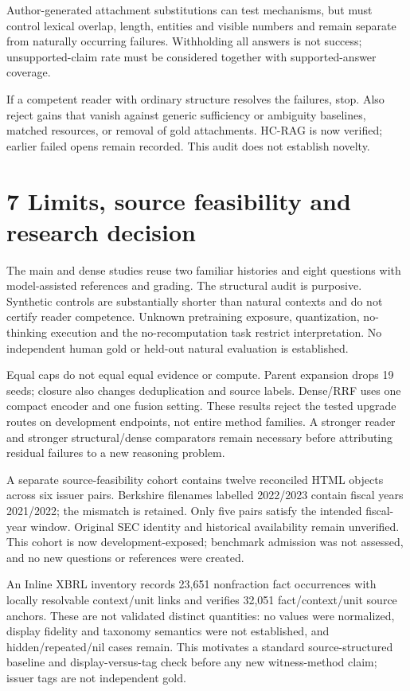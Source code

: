 \documentclass[11pt]{article}
\begin{document}
Author-generated attachment substitutions can test mechanisms, but must control lexical overlap, length, entities and visible numbers and remain separate from naturally occurring failures. Withholding all answers is not success; unsupported-claim rate must be considered together with supported-answer coverage.


If a competent reader with ordinary structure resolves the failures, stop. Also reject gains that vanish against generic sufficiency or ambiguity baselines, matched resources, or removal of gold attachments. HC-RAG is now verified; earlier failed opens remain recorded. This audit does not establish novelty.


\section*{7  Limits, source feasibility and research decision}

The main and dense studies reuse two familiar histories and eight questions with model-assisted references and grading. The structural audit is purposive. Synthetic controls are substantially shorter than natural contexts and do not certify reader competence. Unknown pretraining exposure, quantization, no-thinking execution and the no-recomputation task restrict interpretation. No independent human gold or held-out natural evaluation is established.


Equal caps do not equal equal evidence or compute. Parent expansion drops 19 seeds; closure also changes deduplication and source labels. Dense/RRF uses one compact encoder and one fusion setting. These results reject the tested upgrade routes on development endpoints, not entire method families. A stronger reader and stronger structural/dense comparators remain necessary before attributing residual failures to a new reasoning problem.


A separate source-feasibility cohort contains twelve reconciled HTML objects across six issuer pairs. Berkshire filenames labelled 2022/2023 contain fiscal years 2021/2022; the mismatch is retained. Only five pairs satisfy the intended fiscal-year window. Original SEC identity and historical availability remain unverified. This cohort is now development-exposed; benchmark admission was not assessed, and no new questions or references were created.


An Inline XBRL inventory records 23,651 nonfraction fact occurrences with locally resolvable context/unit links and verifies 32,051 fact/context/unit source anchors. These are not validated distinct quantities: no values were normalized, display fidelity and taxonomy semantics were not established, and hidden/repeated/nil cases remain. This motivates a standard source-structured baseline and display-versus-tag check before any new witness-method claim; issuer tags are not independent gold.
\end{document}
